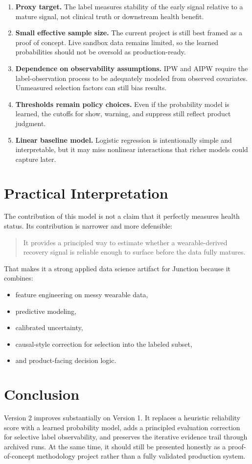 \documentclass[11pt]{article}
\begin{document}
\begin{enumerate}[leftmargin=1.5em]
    \item \textbf{Proxy target.} The label measures stability of the early signal relative to a mature signal, not clinical truth or downstream health benefit.
    \item \textbf{Small effective sample size.} The current project is still best framed as a proof of concept. Live sandbox data remains limited, so the learned probabilities should not be oversold as production-ready.
    \item \textbf{Dependence on observability assumptions.} IPW and AIPW require the label-observation process to be adequately modeled from observed covariates. Unmeasured selection factors can still bias results.
    \item \textbf{Thresholds remain policy choices.} Even if the probability model is learned, the cutoffs for show, warning, and suppress still reflect product judgment.
    \item \textbf{Linear baseline model.} Logistic regression is intentionally simple and interpretable, but it may miss nonlinear interactions that richer models could capture later.
\end{enumerate}

\section{Practical Interpretation}

The contribution of this model is not a claim that it perfectly measures health status. Its contribution is narrower and more defensible:
\begin{quote}
It provides a principled way to estimate whether a wearable-derived recovery signal is reliable enough to surface before the data fully matures.
\end{quote}

That makes it a strong applied data science artifact for Junction because it combines:
\begin{itemize}[leftmargin=1.5em]
    \item feature engineering on messy wearable data,
    \item predictive modeling,
    \item calibrated uncertainty,
    \item causal-style correction for selection into the labeled subset,
    \item and product-facing decision logic.
\end{itemize}

\section{Conclusion}

Version 2 improves substantially on Version 1. It replaces a heuristic reliability score with a learned probability model, adds a principled evaluation correction for selective label observability, and preserves the iterative evidence trail through archived runs. At the same time, it should still be presented honestly as a proof-of-concept methodology project rather than a fully validated production system.
\end{document}
